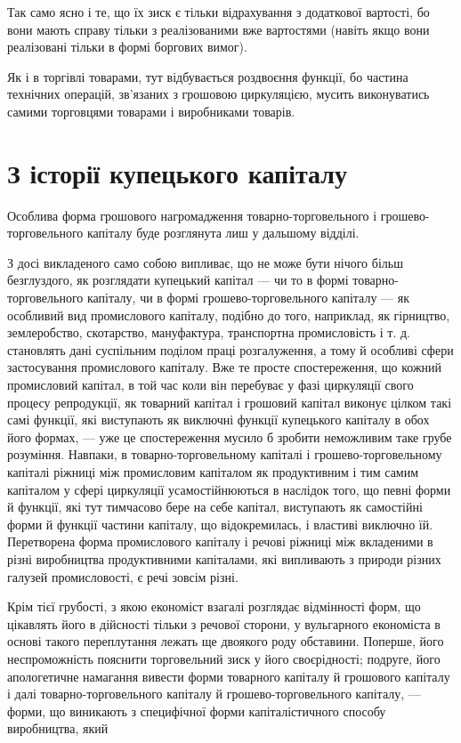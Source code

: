 Так само ясно і те, що їх зиск є тільки відрахування з додаткової
вартості, бо вони мають справу тільки з реалізованими
вже вартостями (навіть якщо вони реалізовані тільки в формі
боргових вимог).

Як і в торгівлі товарами, тут відбувається роздвоєння функції,
бо частина технічних операцій, зв’язаних з грошовою циркуляцією,
мусить виконуватись самими торговцями товарами
і виробниками товарів.

\section{З історії купецького капіталу}

Особлива форма грошового нагромадження товарно-торговельного
і грошево-торговельного капіталу буде розглянута лиш у
дальшому відділі.

З досі викладеного само собою випливає, що не може бути
нічого більш безглуздого, як розглядати купецький капітал —
чи то в формі товарно-торговельного капіталу, чи в формі грошево-торговельного
капіталу — як особливий вид промислового
капіталу, подібно до того, наприклад, як гірництво, землеробство,
скотарство, мануфактура, транспортна промисловість і т. д.
становлять дані суспільним поділом праці розгалуження, а тому й
особливі сфери застосування промислового капіталу. Вже те
просте спостереження, що кожний промисловий капітал, в той час
коли він перебуває у фазі циркуляції свого процесу репродукції,
як товарний капітал і грошовий капітал виконує цілком такі
самі функції, які виступають як виключні функції купецького
капіталу в обох його формах, — уже це спостереження мусило б
зробити неможливим таке грубе розуміння. Навпаки, в товарно-торговельному
капіталі і грошево-торговельному капіталі ріжниці
між промисловим капіталом як продуктивним і тим самим
капіталом у сфері циркуляції усамостійнюються в наслідок того,
що певні форми й функції, які тут тимчасово бере на себе капітал,
виступають як самостійні форми й функції частини капіталу,
що відокремилась, і властиві виключно їй. Перетворена форма
промислового капіталу і речові ріжниці між вкладеними в різні
виробництва продуктивними капіталами, які випливають з природи
різних галузей промисловості, є речі зовсім різні.

Крім тієї грубості, з якою економіст взагалі розглядає відмінності
форм, що цікавлять його в дійсності тільки з речової сторони,
у вульгарного економіста в основі такого переплутання
лежать ще двоякого роду обставини. Поперше, його неспроможність
пояснити торговельний зиск у його своєрідності; подруге,
його апологетичне намагання вивести форми товарного капіталу
й грошового капіталу і далі товарно-торговельного капіталу й
грошево-торговельного капіталу, — форми, що виникають з специфічної
форми капіталістичного способу виробництва, який
\parbreak{}  %
